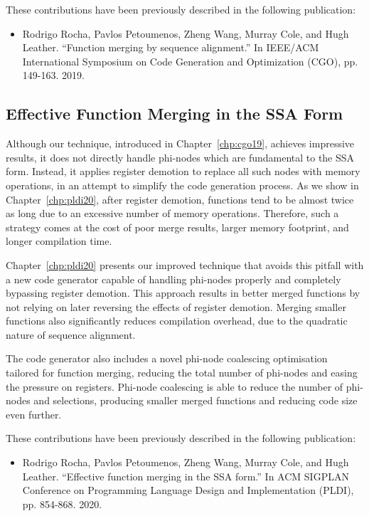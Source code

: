 These contributions have been previously described in the following publication:
\begin{itemize}
\item Rodrigo Rocha, Pavlos Petoumenos, Zheng Wang, Murray Cole, and Hugh Leather. ``Function merging by sequence alignment.'' In IEEE/ACM International Symposium on Code Generation and Optimization (CGO), pp. 149-163. 2019.
\end{itemize}

\subsection{Effective Function Merging in the SSA Form}


Although our technique, introduced in Chapter~\ref{chp:cgo19}, achieves impressive results, it does not directly handle phi-nodes which are fundamental to the SSA form.
Instead, it applies register demotion to replace all such nodes with memory operations, in an attempt to simplify the code generation process.
As we show in Chapter~\ref{chp:pldi20}, after register demotion, functions tend to be almost twice as long due to an excessive number of memory operations.
Therefore, such a strategy comes at the cost of poor merge results, larger memory footprint, and longer compilation time.

Chapter~\ref{chp:pldi20} presents our improved technique that avoids this pitfall with a new code generator capable of handling phi-nodes properly and completely bypassing register demotion.
This approach results in better merged functions by not relying on later reversing the effects of register demotion.
Merging smaller functions also significantly reduces compilation overhead, due to the quadratic nature of sequence alignment.

The code generator also includes a novel phi-node coalescing optimisation tailored for function merging, reducing the total number of phi-nodes and easing the pressure on registers.
Phi-node coalescing is able to reduce the number of phi-nodes and selections, producing smaller merged functions and reducing code size even further.

These contributions have been previously described in the following publication:
\begin{itemize}
\item Rodrigo Rocha, Pavlos Petoumenos, Zheng Wang, Murray Cole, and Hugh Leather. ``Effective function merging in the SSA form.'' In ACM SIGPLAN Conference on Programming Language Design and Implementation (PLDI), pp. 854-868. 2020.
\end{itemize}

